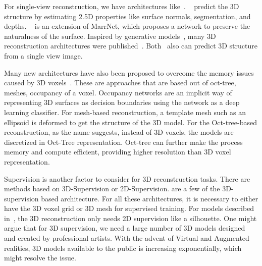 For single-view reconstruction, we have architectures like~\cite{Wu2017,z-gan, Yang2019, Wu2018, popov2020corenet}.
~\cite{Wu2017} predict the 3D structure by estimating 2.5D properties like surface normals, segmentation, and depths.
~\cite{Wu2018} is an extension of MarrNet, which proposes a network to preserve the naturalness of the surface.
Inspired by generative models~\cite{Goodfellow2014,Kingma2014}, many 3D reconstruction architectures were published~\cite{z-gan, Yang2019,Wu2016,Lunz2020InverseGG}.
Both~\cite{Xie_2019, Xie_2020} also can predict 3D structure from a single view image.

Many new architectures have also been proposed to overcome the memory issues caused by 3D voxels~\cite{tatarchenko2017octree,Roth2018,Mescheder2019OccupancyNL,Gkioxari2019MeshR, wang2018pixel2mesh,groueix2018atlasnet,pan2019deep}.
These are approaches that are based out of oct-tree, meshes, occupancy of a voxel.
Occupancy networks are an implicit way of representing 3D surfaces as decision boundaries using the network as a deep learning classifier.
For mesh-based reconstruction, a template mesh such as an ellipsoid is deformed to get the structure of the 3D model.
For the Oct-tree-based reconstruction, as the name suggests, instead of 3D voxels, the models are discretized in Oct-Tree representation.
Oct-tree can further make the process memory and compute efficient, providing higher resolution than 3D voxel representation.

Supervision is another factor to consider for 3D reconstruction tasks.
There are methods based on 3D-Supervision or 2D-Supervision.
\cite{Xie_2019,Xie_2020,Wu2017,groueix2018atlasnet,pan2019deep, chen2019learning} are a few of the 3D-supervision based architecture.
For all these architectures, it is necessary to either have the 3D voxel grid or 3D mesh for supervised training.
For models described in~\cite{Lunz2020InverseGG,henderson2019learning}, the 3D reconstruction only needs 2D supervision like a silhouette.
One might argue that for 3D supervision, we need a large number of 3D models designed and created by professional artists.
With the advent of Virtual and Augmented realities, 3D models available to the public is increasing exponentially, which might resolve the issue.

